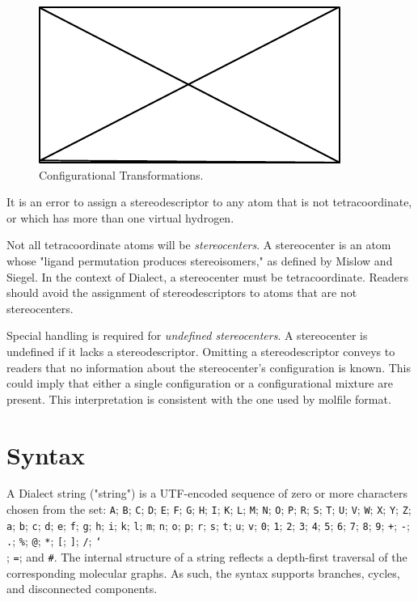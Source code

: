 \documentclass{article}
\def\ttt{\texttt}
\begin{document}
\begin{figure}
    \centering
    \includegraphics{filler}
    \caption{Configurational Transformations.}
    \label{fig:iconfigurational-transformations}
\end{figure}

It is an error to assign a stereodescriptor to any atom that is not tetracoordinate, or which has more than one virtual hydrogen.

Not all tetracoordinate atoms will be \textit{stereocenters}. A stereocenter is an atom whose "ligand permutation produces stereoisomers," as defined by Mislow and Siegel.\cite{mislow1984} In the context of Dialect, a stereocenter must be tetracoordinate. Readers should avoid the assignment of stereodescriptors to atoms that are not stereocenters.

Special handling is required for \textit{undefined stereocenters}. A stereocenter is undefined if it lacks a stereodescriptor. Omitting a stereodescriptor conveys to readers that no information about the stereocenter's configuration is known. This could imply that either a single configuration or a configurational mixture are present. This interpretation is consistent with the one used by molfile format.\cite{ctfileFormats}

\section*{Syntax}

A Dialect string ("string") is a UTF-encoded sequence of zero or more characters chosen from the set: \ttt{A}; \ttt{B}; \ttt{C}; \ttt{D}; \ttt{E}; \ttt{F}; \ttt{G}; \ttt{H}; \ttt{I}; \ttt{K}; \ttt{L}; \ttt{M}; \ttt{N}; \ttt{O}; \ttt{P}; \ttt{R}; \ttt{S}; \ttt{T}; \ttt{U}; \ttt{V}; \ttt{W}; \ttt{X}; \ttt{Y}; \ttt{Z}; \ttt{a}; \ttt{b}; \ttt{c}; \ttt{d}; \ttt{e}; \ttt{f}; \ttt{g}; \ttt{h}; \ttt{i}; \ttt{k}; \ttt{l}; \ttt{m}; \ttt{n}; \ttt{o}; \ttt{p}; \ttt{r}; \ttt{s}; \ttt{t}; \ttt{u}; \ttt{v}; \ttt{0}; \ttt{1}; \ttt{2}; \ttt{3}; \ttt{4}; \ttt{5}; \ttt{6}; \ttt{7}; \ttt{8}; \ttt{9}; \ttt{+}; \ttt{-}; \ttt{.}; \ttt{\%}; \ttt{@}; \ttt{*}; \ttt{[}; \ttt{]}; \ttt{/}; \ttt{\char`\\}; \ttt{=}; and \ttt{\#}. The internal structure of a string reflects a depth-first traversal of the corresponding molecular graphs. As such, the syntax supports branches, cycles, and disconnected components.
\end{document}
